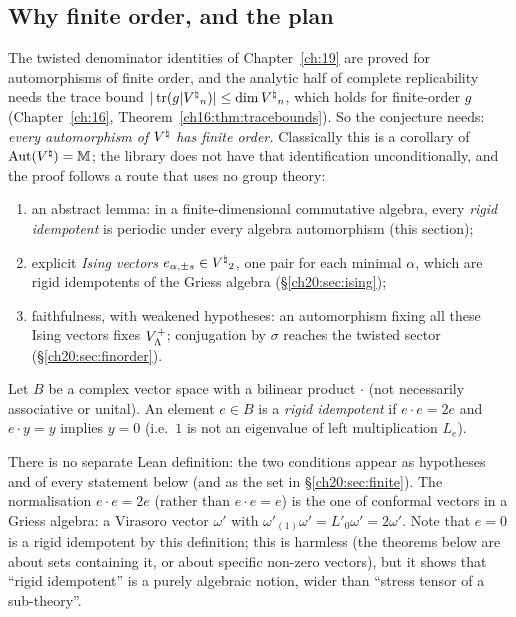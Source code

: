 \subsection{Why finite order, and the plan}

The twisted denominator identities of Chapter~\ref{ch:19} are proved for automorphisms of finite order, and the
analytic half of complete replicability needs the trace bound $|\operatorname{tr}(g|{V^{\natural}}_n)|\le\dim{V^{\natural}}_n$, which holds for
finite-order $g$ (Chapter~\ref{ch:16}, Theorem~\ref{ch16:thm:tracebounds}).  So the conjecture needs: \emph{every
automorphism of ${V^{\natural}}$ has finite order.}  Classically this is a corollary of $\operatorname{Aut}({V^{\natural}})=\mathbb M$; the library
does not have that identification unconditionally, and the proof follows a route that uses no group theory:
\begin{enumerate}[label=(\arabic*)]
\item an abstract lemma: in a finite-dimensional commutative algebra, every \emph{rigid idempotent} is periodic under
  every algebra automorphism (this section);
\item explicit \emph{Ising vectors} $e_{\alpha,\pm s}\in{V^{\natural}}_2$, one pair for each minimal $\alpha$, which are rigid
  idempotents of the Griess algebra (\S\ref{ch20:sec:ising});
\item faithfulness, with weakened hypotheses: an automorphism fixing all these Ising vectors fixes $V_{\Lambda}^{+}$; conjugation
  by $\sigma$ reaches the twisted sector (\S\ref{ch20:sec:finorder}).
\end{enumerate}

\begin{definition}\label{ch20:def:rigid}
Let $B$ be a complex vector space with a bilinear product $\cdot$ (not necessarily associative or unital).  An element
$e\in B$ is a \emph{rigid idempotent} if $e\cdot e=2e$ and $e\cdot y=y$ implies $y=0$ (i.e.\ $1$ is not an eigenvalue of
left multiplication $L_e$).
\end{definition}
There is no separate Lean definition: the two conditions appear as hypotheses  and
 of every statement below (and as the set  in
\S\ref{ch20:sec:finite}).  The normalisation $e\cdot e=2e$ (rather than $e\cdot e=e$) is the one of conformal vectors in
a Griess algebra: a Virasoro vector $\omega'$ with $\omega'_{(1)}\omega'=L'_0\omega'=2\omega'$.  Note that $e=0$ is a rigid
idempotent by this definition; this is harmless (the theorems below are about sets containing it, or about specific non-zero
vectors), but it shows that ``rigid idempotent'' is a purely algebraic notion, wider than ``stress tensor of a sub-theory''.

